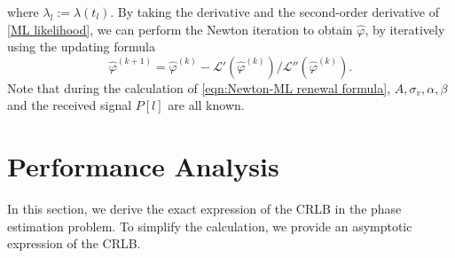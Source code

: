 \documentclass[conference,10pt,twocolumn]{IEEEtran}
\theoremstyle{nonumberplain}
\begin{document}
    where $\lambda_l := \lambda(t_l)$. By taking the derivative and the second-order derivative of \eqref{ML likelihood}, we can perform the Newton iteration to obtain $\hat{\varphi}$, by iteratively using the updating formula
    \begin{equation}
        \hat{\varphi}^{(k+1)} = \hat{\varphi}^{(k)} - \mathcal{L}'(\hat{\varphi}^{(k)})/\mathcal{L}''(\hat{\varphi}^{(k)}).
        \label{eqn:Newton-ML renewal formula}
    \end{equation}
    Note that during the calculation of \eqref{eqn:Newton-ML renewal formula}, $A, \sigma_v, \alpha, \beta$ and the received signal $P[l]$ are all known.
    
\section{Performance Analysis}
\label{Performance Analysis}
    In this section, we derive the exact expression of the CRLB in the phase estimation problem. 
    To simplify the calculation, we provide an asymptotic expression of the CRLB.
\end{document}

